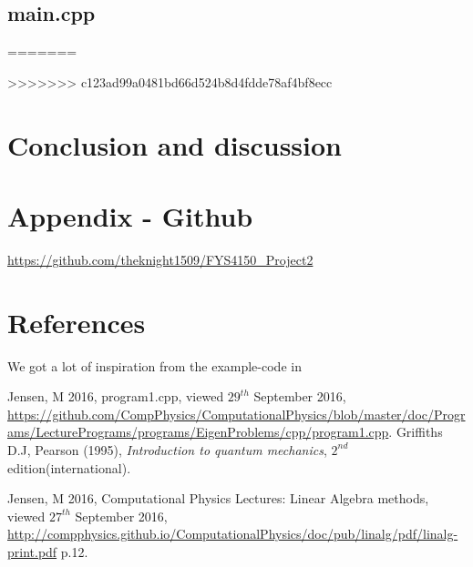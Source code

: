 \documentclass[11pt,a4paper,notitlepage]{article}
\begin{document}
\subsection{main.cpp}
=======


>>>>>>> c123ad99a0481bd66d524b8d4fdde78af4bf8ecc
\section{Conclusion and discussion}
\section{Appendix - Github} \label{section:github}
\url{https://github.com/theknight1509/FYS4150_Project2}
\section{References}
We got a lot of inspiration from the example-code in \cite[web-site]{example_code}

\begin{thebibliography}{9}

  Jensen, M 2016,
  program1.cpp,
  viewed $29^{th}$ September 2016,
  \url{https://github.com/CompPhysics/ComputationalPhysics/blob/master/doc/Programs/LecturePrograms/programs/EigenProblems/cpp/program1.cpp}.
  Griffiths D.J, 
  Pearson (1995),
  \emph{Introduction to quantum mechanics},
  $2^{nd}$ edition(international).
  
	Jensen, M 2016, 
	Computational Physics Lectures: Linear
Algebra methods, 
	viewed $27^{th}$ September 2016, 
	\url{http://compphysics.github.io/ComputationalPhysics/doc/pub/linalg/pdf/linalg-print.pdf} p.12. 

\end{thebibliography}
\end{document}
